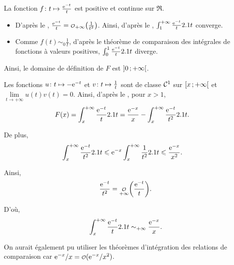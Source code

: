 \begin{elemsolution}
\begin{reponses}
\item La fonction $\fonctionligne[f]{t}{\frac{\e^{-t}}{t}}$ est positive et continue sur $\Re$.

\begin{itemize}
\item D'après le , $\frac{\e^{-t}}{t} = \petito_{+\infty}\mathopen{}\left(\frac{1}{t^2}\right)$. Ainsi, d'après le , $\int_1^{+\infty} \frac{\e^{-t}}{t} \d t$ converge.

\item Comme $f(t) \sim_0 \frac{1}{t}$, d'après le théorème de comparaison des intégrales de fonctions à valeurs positives, $\int_0^1 \frac{\e^{-t}}{t} \d t$ diverge.
\end{itemize}

Ainsi, le domaine de définition de $F$ est $\interoo{0}{+ \infty}$.

\item Les fonctions $\fonctionligne[u]{t}{-\e^{-t}}$ et $\fonctionligne[v]{t}{\frac{1}{t}}$ sont de classe $\Cont^1$ sur $\interfo{x}{+\infty}$ et $\lim\limits_{t\to+\infty} u(t) v(t) = 0$. Ainsi, d'après le , pour $x > 1$, 
\begin{align*}
F(x)
&= \int_x^{+ \infty} \frac{\e^{-t}}{t} \d t 
= \frac{\e^{-x}}{x} - \int_x^{+\infty} \frac{\e^{-t}}{t^2} \d t.
\end{align*}

De plus,
\begin{align*}
\int_x^{+\infty} \frac{\e^{-t}}{t^2} \d t
&\leqslant \e^{-x} \int_x^{+\infty} \frac{1}{t^2} \d t
\leqslant \frac{\e^{-x}}{x^2}.
\end{align*}

Ainsi,
$$\frac{\e^{-t}}{t^2} = \petito_{+\infty}\mathopen{}\bigg( \frac{\e^{-t}}{t} \bigg).$$

D'où,
\[
\int_x^{+\infty} \frac{\e^{-t}}{t} \d t \sim_{+\infty} \frac{\e^{-x}}{x}.
\]

\begin{remarque}
On aurait également pu utiliser les théorèmes d'intégration des relations de comparaison car $\e^{-x}/x = \petito(\e^{-x}/x^2)$.
\end{remarque}


\end{reponses}
\end{elemsolution}
